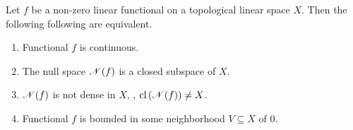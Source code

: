 \begin{thm}
\label{thm:topological_linear_spaces:linear_functional}
Let $f$ be a non-zero linear functional on a topological linear space $X$. 
Then the following following are equivalent. 
\begin{enumerate}
    \item \label{thm:topological_linear_spaces:linear_functional:1}
    Functional $f$ is continuous. 
    \item \label{thm:topological_linear_spaces:linear_functional:2}
    The null space $\mathscr{N}(f)$ is a closed subspace of $X$. 
    \item \label{thm:topological_linear_spaces:linear_functional:3}
    $\mathscr{N}(f)$ is not dense in $X$, \ie, $\operatorname{cl}{(\mathscr{N}(f))} \neq X$. 
    \item \label{thm:topological_linear_spaces:linear_functional:4}
    Functional $f$ is bounded in some neighborhood $V \subseteq X$ 
    of $0$. 
\end{enumerate}
\end{thm}
